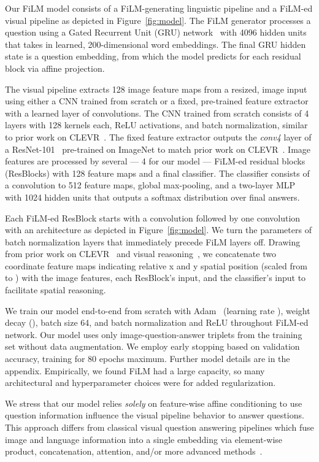 \documentclass[letterpaper]{article} \usepackage{aaai18}  \usepackage{times}  \usepackage{helvet}  \usepackage{courier}  \usepackage{url}  \usepackage{graphicx}  \frenchspacing  \setlength{\pdfpagewidth}{8.5in}  \setlength{\pdfpageheight}{11in}
\begin{document}
		Our FiLM model consists of a FiLM-generating linguistic pipeline and a FiLM-ed visual pipeline as depicted in Figure~\ref{fig:model}. The FiLM generator processes a question  using a Gated Recurrent Unit (GRU) network~\cite{GRU} with 4096 hidden units that takes in learned, 200-dimensional word embeddings. The final GRU hidden state is a question embedding, from which the model predicts  for each  residual block via affine projection.

        The visual pipeline extracts 128  image feature maps from a resized,  image input using either a CNN trained from scratch or a fixed, pre-trained feature extractor with a learned layer of  convolutions. The CNN trained from scratch consists of 4 layers with 128  kernels each, ReLU activations, and batch normalization, similar to prior work on CLEVR~\cite{RN}. The fixed feature extractor outputs the \textit{conv4} layer of a ResNet-101~\cite{ResNet} pre-trained on ImageNet \cite{ImageNet} to match prior work on CLEVR~\cite{CLEVR,IEP}. Image features are processed by several --- 4 for our model --- FiLM-ed residual blocks (ResBlocks) with 128 feature maps and a final classifier. The classifier consists of a  convolution to 512 feature maps, global max-pooling, and a two-layer MLP with 1024 hidden units that outputs a softmax distribution over final answers.

        Each FiLM-ed ResBlock starts with a  convolution followed by one  convolution with an architecture as depicted in Figure~\ref{fig:model}. We turn the parameters of batch normalization layers that immediately precede FiLM layers off. Drawing from prior work on CLEVR~\cite{N2NMN,RN} and visual reasoning~\cite{VIN}, we concatenate two coordinate feature maps indicating relative x and y spatial position (scaled from  to ) with the image features, each ResBlock's input, and the classifier's input to facilitate spatial reasoning.
        
        We train our model end-to-end from scratch with Adam~\cite{Adam} (learning rate ), weight decay (), batch size 64, and batch normalization and ReLU throughout FiLM-ed network. Our model uses only image-question-answer triplets from the training set without data augmentation. We employ early stopping based on validation accuracy, training for 80 epochs maximum. Further model details are in the appendix. Empirically, we found FiLM had a large capacity, so many architectural and hyperparameter choices were for added regularization.
        
        We stress that our model relies \textit{solely} on feature-wise affine conditioning to use question information influence the visual pipeline behavior to answer questions. This approach differs from classical visual question answering pipelines which fuse image and language information into a single embedding via element-wise product, concatenation, attention, and/or more advanced methods~\cite{SANs,lu2016hierarchical,anderson2017bottom}.
        
\end{document}
